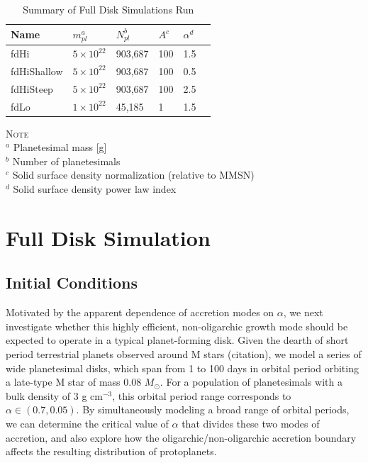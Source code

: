 \documentclass[twocolumn]{aastex63}
\begin{document}
\begin{table}
\caption{Summary of Full Disk Simulations Run}
\begin{tabular}{llllll} \hline \hline
Name    & $m_{pl}^{a}$ & $N_{pl}^{b}$ & $A^{c}$ & $\alpha^{d}$ &  \\ \hline
fdHi                 & $5 \times 10^{22}$ & 903,687 & 100                                                         & 1.5                              &   \\
fdHiShallow    & $5 \times 10^{22}$ & 903,687 & 100                                                        & 0.5                              &   \\
fdHiSteep       & $5 \times 10^{22}$ & 903,687 & 100                                                         & 2.5                              &   \\
fdLo                & $1 \times 10^{22}$ & 45,185    & 1                                                             & 1.5                              &   \\ \hline
\end{tabular}
\begin{flushleft}
\textsc{Note} \\ {$^a$ Planetesimal mass [g] \\
		       $^b$ Number of planetesimals \\
		       $^c$ Solid surface density normalization (relative to MMSN) \\
		       $^d$ Solid surface density power law index } \\
\end{flushleft}
\label{tab:sims}
\end{table}

\section{Full Disk Simulation}\label{sec:fulldisk}

\subsection{Initial Conditions}

Motivated by the apparent dependence of accretion modes on $\alpha$, we next investigate whether this highly efficient, non-oligarchic growth mode should be expected to operate in a typical planet-forming disk. Given the dearth of short period terrestrial planets observed around M stars (citation), we model a series of wide planetesimal disks, which span from 1 to 100 days in orbital period orbiting a late-type M star of mass 0.08 $M_{\odot}$. For a population of planetesimals with a bulk density of 3 g cm$^{-3}$, this orbital period range corresponds to $\alpha \in (0.7, 0.05)$. By simultaneously modeling a broad range of orbital periods, we can determine the critical value of $\alpha$ that divides these two modes of accretion, and also explore how the oligarchic/non-oligarchic accretion boundary affects the resulting distribution of protoplanets.
\end{document}
